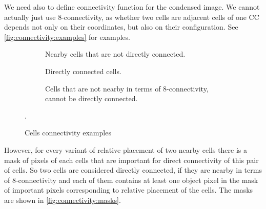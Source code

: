 \documentclass[hidelinks]{llncs}
\begin{document}
We need also to define connectivity function for the condensed image.
We cannot actually just use 8-connectivity, as whether two cells are adjacent
cells of one CC depends not only on their coordinates, but also on their
configuration. See \autoref{fig:connectivity:examples} for examples.

\begin{figure}
  \centering
  \begin{subfigure}[t]{0.3\linewidth}
    \centering
    \caption{Nearby cells that are not directly connected.}
  \end{subfigure}
  \quad
  \begin{subfigure}[t]{0.3\linewidth}
    \centering
    \caption{Directly connected cells.}
  \end{subfigure}
  \quad
  \begin{subfigure}[t]{0.3\linewidth}
    \centering
    \caption{Cells that are not nearby in terms of 8-connectivity, cannot be
    directly connected.}
  \end{subfigure}
  \caption{Cells connectivity examples}
  \label{fig:connectivity:examples}.
\end{figure}

However, for every variant of relative placement of two nearby cells there is
a mask of pixels of each cells that are important for direct connectivity of
this pair of cells.
So two cells are considered directly connected, if they are nearby
in terms of 8-connectivity and each of them contains at least one object pixel
in the mask of important pixels corresponding to relative placement of the
cells. The masks are shown in \autoref{fig:connectivity:masks}.
\end{document}
